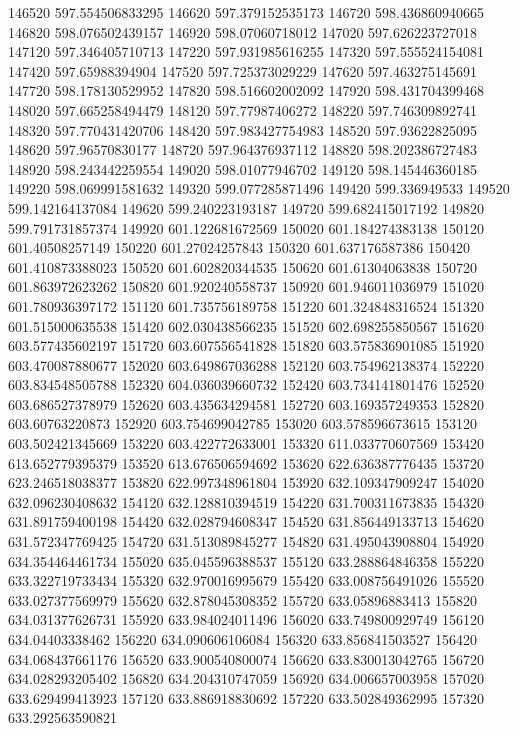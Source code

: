 {146520 597.554506833295
146620 597.379152535173
146720 598.436860940665
146820 598.076502439157
146920 598.07060718012
147020 597.626223727018
147120 597.346405710713
147220 597.931985616255
147320 597.555524154081
147420 597.65988394904
147520 597.725373029229
147620 597.463275145691
147720 598.178130529952
147820 598.516602002092
147920 598.431704399468
148020 597.665258494479
148120 597.77987406272
148220 597.746309892741
148320 597.770431420706
148420 597.983427754983
148520 597.93622825095
148620 597.96570830177
148720 597.964376937112
148820 598.202386727483
148920 598.243442259554
149020 598.01077946702
149120 598.145446360185
149220 598.069991581632
149320 599.077285871496
149420 599.336949533
149520 599.142164137084
149620 599.240223193187
149720 599.682415017192
149820 599.791731857374
149920 601.122681672569
150020 601.184274383138
150120 601.40508257149
150220 601.27024257843
150320 601.637176587386
150420 601.410873388023
150520 601.602820344535
150620 601.61304063838
150720 601.863972623262
150820 601.920240558737
150920 601.946011036979
151020 601.780936397172
151120 601.735756189758
151220 601.324848316524
151320 601.515000635538
151420 602.030438566235
151520 602.698255850567
151620 603.577435602197
151720 603.607556541828
151820 603.575836901085
151920 603.470087880677
152020 603.649867036288
152120 603.754962138374
152220 603.834548505788
152320 604.036039660732
152420 603.734141801476
152520 603.686527378979
152620 603.435634294581
152720 603.169357249353
152820 603.60763220873
152920 603.754699042785
153020 603.578596673615
153120 603.502421345669
153220 603.422772633001
153320 611.033770607569
153420 613.652779395379
153520 613.676506594692
153620 622.636387776435
153720 623.246518038377
153820 622.997348961804
153920 632.109347909247
154020 632.096230408632
154120 632.128810394519
154220 631.700311673835
154320 631.891759400198
154420 632.028794608347
154520 631.856449133713
154620 631.572347769425
154720 631.513089845277
154820 631.495043908804
154920 634.354464461734
155020 635.045596388537
155120 633.288864846358
155220 633.322719733434
155320 632.970016995679
155420 633.008756491026
155520 633.027377569979
155620 632.878045308352
155720 633.05896883413
155820 634.031377626731
155920 633.984024011496
156020 633.749800929749
156120 634.04403338462
156220 634.090606106084
156320 633.856841503527
156420 634.068437661176
156520 633.900540800074
156620 633.830013042765
156720 634.028293205402
156820 634.204310747059
156920 634.006657003958
157020 633.629499413923
157120 633.886918830692
157220 633.502849362995
157320 633.292563590821
}
